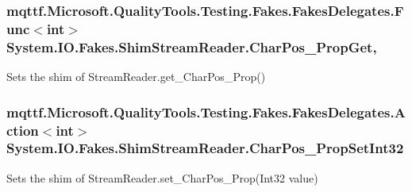\hypertarget{class_system_1_1_i_o_1_1_fakes_1_1_shim_stream_reader_a311bc16265e50fab9ad1efd3dcf7b2e1}{
\subsubsection[{Char\-Pos\-\_\-\-Prop\-Get}]{\setlength{\rightskip}{0pt plus 5cm}mqttf.\-Microsoft.\-Quality\-Tools.\-Testing.\-Fakes.\-Fakes\-Delegates.\-Func$<$int$>$ System.\-I\-O.\-Fakes.\-Shim\-Stream\-Reader.\-Char\-Pos\-\_\-\-Prop\-Get\hspace{0.3cm}{\ttfamily [get]}, {\ttfamily [set]}}}\label{class_system_1_1_i_o_1_1_fakes_1_1_shim_stream_reader_a311bc16265e50fab9ad1efd3dcf7b2e1}


Sets the shim of Stream\-Reader.\-get\-\_\-\-Char\-Pos\-\_\-\-Prop()

\hypertarget{class_system_1_1_i_o_1_1_fakes_1_1_shim_stream_reader_a7e15352980d785745ec96d3b01be93d5}{
\subsubsection[{Char\-Pos\-\_\-\-Prop\-Set\-Int32}]{\setlength{\rightskip}{0pt plus 5cm}mqttf.\-Microsoft.\-Quality\-Tools.\-Testing.\-Fakes.\-Fakes\-Delegates.\-Action$<$int$>$ System.\-I\-O.\-Fakes.\-Shim\-Stream\-Reader.\-Char\-Pos\-\_\-\-Prop\-Set\-Int32\hspace{0.3cm}{\ttfamily [set]}}}\label{class_system_1_1_i_o_1_1_fakes_1_1_shim_stream_reader_a7e15352980d785745ec96d3b01be93d5}


Sets the shim of Stream\-Reader.\-set\-\_\-\-Char\-Pos\-\_\-\-Prop(\-Int32 value)

